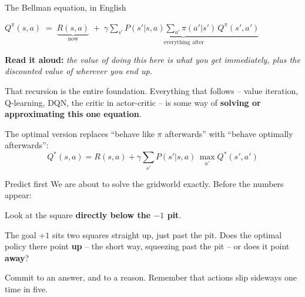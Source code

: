 \documentclass[aspectratio=169]{beamer}
\begin{document}
\begin{frame}{The Bellman equation, in English}
  \begin{center}
    {\large $Q^\pi(s,a) \;=\; \underbrace{R(s,a)}_{\text{now}} \;+\; \gamma
      \underbrace{\textstyle\sum_{s'} P(s'|s,a) \sum_{a'} \pi(a'|s')\, Q^\pi(s',a')}_{\text{everything after}}$}
  \end{center}

  \vskip 10pt
  \begin{tcolorbox}[colback=paramgreen!8, colframe=paramgreen, boxrule=0.6pt, arc=2pt]
    \textbf{Read it aloud:} \emph{the value of doing this here is what you get immediately,
    plus the discounted value of wherever you end up.}
  \end{tcolorbox}

  \vskip 8pt
  \small
  That recursion is the entire foundation. Everything that follows -- value iteration,
  Q-learning, DQN, the critic in actor-critic -- is some way of \textbf{solving or
  approximating this one equation}.

  \vskip 6pt
  The optimal version replaces ``behave like $\pi$ afterwards'' with ``behave optimally
  afterwards'':
  \[ Q^*(s,a) = R(s,a) + \gamma \sum_{s'} P(s'|s,a)\, \max_{a'} Q^*(s',a') \]
\end{frame}

\begin{frame}{Predict first}
  We are about to solve the gridworld exactly. Before the numbers appear:

  \vskip 10pt
  \begin{tcolorbox}[colback=armorange!12, colframe=armorange, boxrule=0.8pt, arc=2pt]
    Look at the square \textbf{directly below the $-1$ pit}.

    \vskip 4pt
    The goal $+1$ sits two squares straight up, just past the pit. Does the optimal policy
    there point \textbf{up} -- the short way, squeezing past the pit -- or does it point
    \textbf{away}?
  \end{tcolorbox}

  \vskip 12pt
  \small
  Commit to an answer, and to a reason. Remember that actions slip sideways one time in five.
\end{frame}
\end{document}
